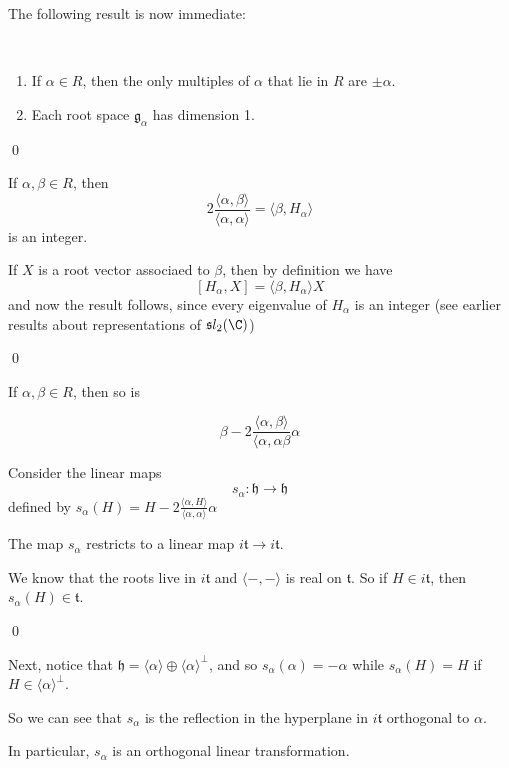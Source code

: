 \documentclass[x11names,reqno,14pt]{extarticle}
\newcommand{\mk}[1]{\mathfrak{#1}}
\newcommand{\g}{\mk{g}}
\newcommand{\h}{\mk{h}}
\begin{document}
The following result is now immediate: 

\thm
\,
\begin{enumerate}

\item If $\alpha\in R$, then the only multiples of $\alpha$ that lie in $R$ are $\pm\alpha$. 

\item Each root space $\g_\alpha$ has dimension 1. 

\end{enumerate}

\qed

\prop

If $\alpha,\beta\in R$, then
\[
2\frac{\langle\alpha,\beta\rangle}{\langle\alpha,\alpha\rangle} = \langle\beta,H_\alpha\rangle
\]
is an integer. 

\proof

If $X$ is a root vector associaed to $\beta$, then by definition we have
\[
[H_\alpha,X]=\langle\beta,H_\alpha\rangle X
\]
and now the result follows, since every eigenvalue of $H_\alpha$ is an integer (see earlier results about representations of $\mk{s}l_2(\C)$)

\qed

\thm

If $\alpha,\beta\in R$, then so is 

\[
\beta - 2\frac{\langle\alpha,\beta\rangle}{\langle\alpha,\alpha\beta}\alpha
\]

\proof

Consider the linear maps 
\[
s_\alpha:\h\to\h
\]
defined by $s_\alpha(H) = H - 2\frac{\langle\alpha,H\rangle}{\langle\alpha,\alpha\rangle}\alpha$

\claim

The map $s_\alpha$ restricts to a linear map $i\mk{t}\to i\mk{t}$.

\proof We know that the roots live in $i\mk{t}$ and $\langle -,-\rangle$ is real on $\mk{t}$. So if $H \in i\mk{t}$, then $s_\alpha(H)\in\mk{t}$.

\qed

Next, notice that $\h = \langle\alpha\rangle\oplus\langle\alpha\rangle^\perp$, and so $s_\alpha(\alpha)=-\alpha$ while $s_\alpha(H) = H$ if $H \in \langle\alpha\rangle^\perp$.

So we can see that $s_\alpha$ is the reflection in the hyperplane in $i\mk{t}$ orthogonal to $\alpha$. 

In particular, $s_\alpha$ is an orthogonal linear transformation. 
\end{document}
